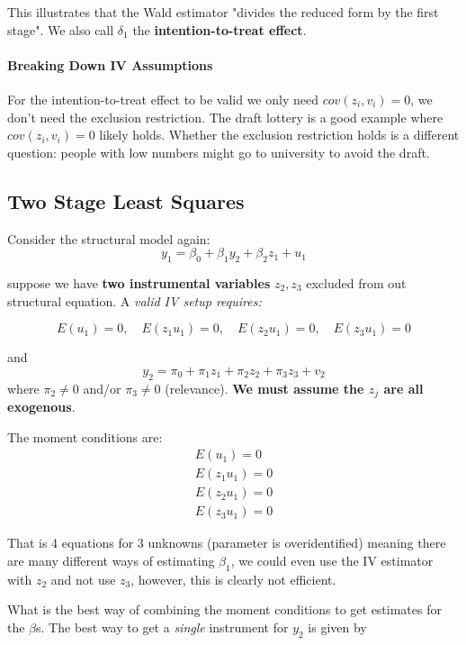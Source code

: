 \documentclass[11pt]{article}
\begin{document}
This illustrates that the Wald estimator "divides the reduced form by the first stage". We also call $\delta_1$ the \textbf{intention-to-treat effect}.

\paragraph{Breaking Down IV Assumptions} \mbox{}

For the intention-to-treat effect to be valid we only need $cov(z_i,v_i) = 0$, we don't need the exclusion restriction. The draft lottery is a good example where $cov(z_i,v_i) =0$ likely holds. Whether the exclusion restriction holds is a different question: people with low numbers might go to university to avoid the draft.

\subsection{Two Stage Least Squares}

Consider the structural model again:
\[y_1 = \beta_0 + \beta_1 y_2 + \beta_2 z_1 + u_1\]

suppose we have \textbf{two instrumental variables} $z_2, z_3$ excluded from out structural equation. A \textit{valid IV setup requires:}

\[E(u_1) = 0, \quad E(z_1u_1) = 0, \quad E(z_2u_1)=0,\quad E(z_3u_1)=0\]

and 
\begin{equation}
y_2=\pi_0+\pi_1 z_1+\pi_2 z_2+\pi_3 z_3+v_2
\end{equation}
where $\pi_2 \neq 0$ and/or $\pi_3 \neq0$ (relevance). \textbf{We must assume the $z_j$ are all exogenous}.

The moment conditions are:
\begin{gather*}
        E(u_1) = 0 \\
        E(z_1 u_1) = 0 \\
        E(z_2 u_1) = 0 \\
        E(z_3 u_1) = 0
    \end{gather*}

    That is 4 equations for 3 unknowns (parameter is overidentified) meaning there are many different ways of estimating $\beta_1$, we could even use the IV estimator with $z_2$ and not use $z_3$, however, this is clearly not efficient.

    What is the best way of combining the moment conditions to get estimates for the $\beta$s. The best way to get a \textit{single} instrument for $y_2$ is given by 
\end{document}
